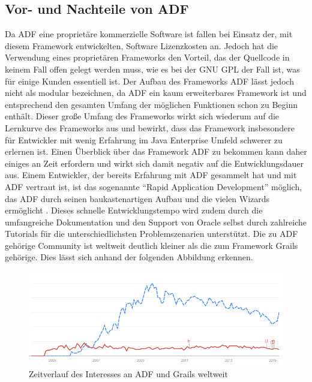 \subsection{Vor- und Nachteile von ADF}
Da ADF eine proprietäre kommerzielle Software ist fallen bei Einsatz der, mit diesem Framework entwickelten, Software Lizenzkosten an. Jedoch hat die Verwendung eines proprietären Frameworks den Vorteil, das der Quellcode in keinem Fall offen gelegt werden muss, wie es bei der GNU GPL\autocite{GNU2015} der Fall ist, was für einige Kunden essentiell ist. Der Aufbau des Frameworks ADF lässt jedoch nicht als modular bezeichnen, da ADF ein kaum erweiterbares Framework ist und entsprechend den gesamten Umfang der möglichen Funktionen schon zu Beginn enthält. Dieser große Umfang des Frameworks wirkt sich wiederum auf die Lernkurve des Frameworks aus und bewirkt, dass das Framework insbesondere für Entwickler mit wenig Erfahrung im Java Enterprise Umfeld schwerer zu erlernen ist\autocite[S.24]{AUW2009}. Einen Überblick über das Framework ADF zu bekommen kann daher einiges an Zeit erfordern und wirkt sich damit negativ auf die Entwicklungsdauer aus. Einem Entwickler, der bereits Erfahrung mit ADF gesammelt hat und mit ADF vertraut ist, ist das sogenannte "`Rapid Application Development"' möglich, das ADF durch seinen baukastenartigen Aufbau und die vielen Wizards ermöglicht \autocite[S.3]{ARIA2015}. Dieses schnelle Entwicklungstempo wird zudem durch die umfangreiche Dokumentation und den Support von Oracle selbst durch zahlreiche Tutorials für die unterschiedlichsten Problemszenarien unterstützt. Die zu ADF gehörige Community ist weltweit deutlich kleiner als die zum Framework Grails gehörige. Dies lässt sich anhand der folgenden Abbildung erkennen. 
\begin{figure}[h]
\centering
\includegraphics[width=\textwidth]{img/interesse_zeitl.png}
\caption{Zeitverlauf des Interesses an ADF und Grails weltweit \autocite{GT2015} }
\end{figure}
